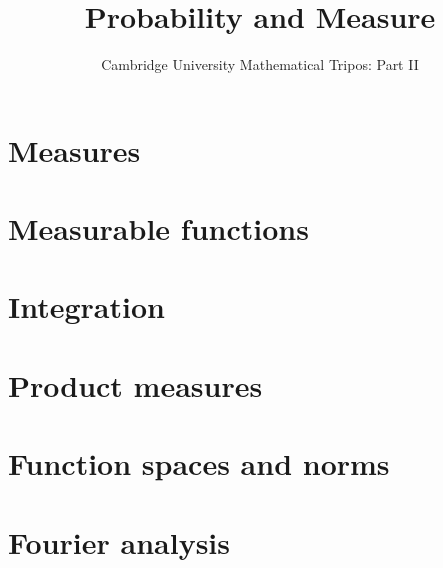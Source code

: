 \documentclass{article}
\title{Probability and Measure}
\author{Cambridge University Mathematical Tripos: Part II}
\begin{document}
\maketitle

\tableofcontentsnewpage{}

\section{Measures}

\section{Measurable functions}

\section{Integration}

\section{Product measures}

\section{Function spaces and norms}

\section{Fourier analysis}

\end{document}
